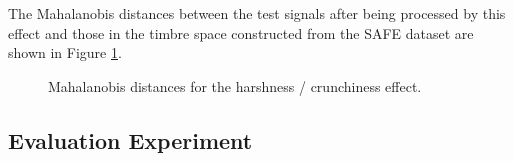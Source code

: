 			The Mahalanobis distances between the test signals after being processed by this effect and those in
			the timbre space constructed from the SAFE dataset are shown in Figure \ref{fig:CrunchJeffs}.

			\begin{figure}[h!]
				\centering
				\quad
				\caption{Mahalanobis distances for the harshness / crunchiness effect.}
				\label{fig:CrunchJeffs}
			\end{figure}

	\subsection{Evaluation Experiment}
	\label{sec:PerceptualExperiments-SemanticControl-EvaluationExperiment}

